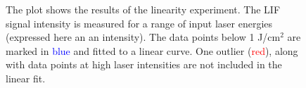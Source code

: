 \begin{figure}

\centering



\caption[Results of the linearity experiment]{The plot shows the results of the linearity experiment. The LIF signal intensity is measured for a range of input laser energies (expressed here an an intensity). The data points below 1 J/cm\(^2\) are marked in \textcolor{blue}{blue} and fitted to a linear curve. One outlier (\textcolor{red}{red}), along with data points at high laser intensities are not included in the linear fit.}

\label{fig:linearityResults}

\end{figure}

